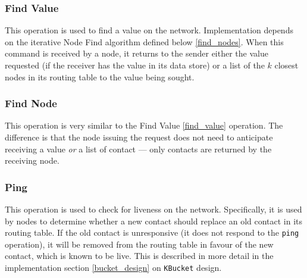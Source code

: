 \documentclass[12pt]{report}
\newcommand{\code}[1]{\colorbox{codegray}{\texttt{#1}}}
\begin{document}
            \subsubsection{Find Value\label{find_value}}
                This operation is used to find a value on the network.
                Implementation depends on the iterative Node Find algorithm
                defined below \ref{find_nodes}.  When this command is received
                by a node, it returns to the sender either the value requested
                (if the receiver has the value in its data store) or a list of
                the $k$ closest nodes in its routing table to the value being
                sought.
            \subsubsection{Find Node}
                This operation is very similar to the Find Value
                \ref{find_value} operation.  The difference is that the node
                issuing the request does not need to anticipate receiving a
                value \textit{or} a list of contact --- only contacts are
                returned by the receiving node.
            \subsubsection{Ping}
                This operation is used to check for liveness on the network.
                Specifically, it is used by nodes to determine whether a new
                contact should replace an old contact in its routing table.  If
                the old contact is unresponsive (it does not respond to the
                \code{ping} operation), it will be removed from the routing
                table in favour of the new contact, which is known to be live.
                This is described in more detail in the implementation section
                \ref{bucket_design} on \code{KBucket} design.
\end{document}
